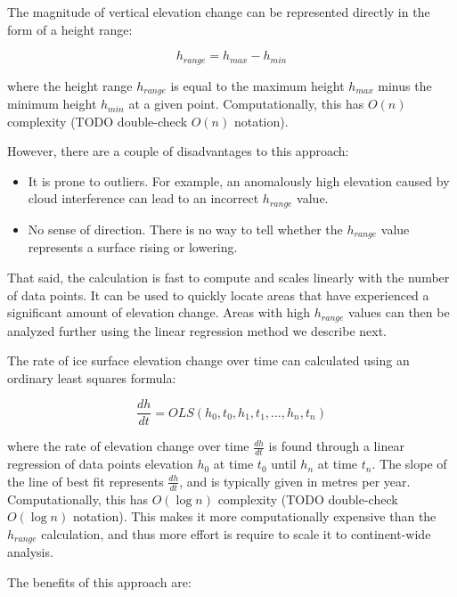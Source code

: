 The magnitude of vertical elevation change can be represented directly in the form of a height range:

\begin{equation}\label{eq:4.8}
  h_{range} = h_{max} - h_{min}
\end{equation}

where the height range $h_{range}$ is equal to the maximum height $h_{max}$ minus the minimum height $h_{min}$ at a given point.
Computationally, this has $O(n)$ complexity (TODO double-check $O(n)$ notation).

However, there are a couple of disadvantages to this approach:

\begin{itemize}
  \item It is prone to outliers. For example, an anomalously high elevation caused by cloud interference can lead to an incorrect $h_{range}$ value.
  \item No sense of direction. There is no way to tell whether the $h_{range}$ value represents a surface rising or lowering.
\end{itemize}

That said, the calculation is fast to compute and scales linearly with the number of data points.
It can be used to quickly locate areas that have experienced a significant amount of elevation change.
Areas with high $h_{range}$ values can then be analyzed further using the linear regression method we describe next.

The rate of ice surface elevation change over time can calculated using an ordinary least squares formula:

\begin{equation}\label{eq:4.9}
  \frac{dh}{dt} = OLS( h_0, t_0, h_1, t_1, \dots, h_n, t_n )
\end{equation}

where the rate of elevation change over time $\frac{dh}{dt}$ is found through a linear regression of data points elevation $h_0$ at time $t_0$ until $h_n$ at time $t_n$.
The slope of the line of best fit represents $\frac{dh}{dt}$, and is typically given in metres per year.
Computationally, this has $O(\log n)$ complexity (TODO double-check $O(\log n)$ notation).
This makes it more computationally expensive than the $h_{range}$ calculation, and thus more effort is require to scale it to continent-wide analysis.


The benefits of this approach are:

